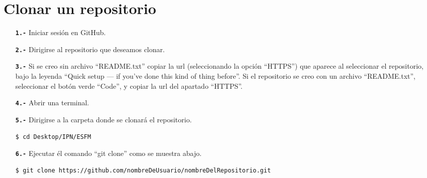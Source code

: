 \section{Clonar un repositorio}
\begin{itemize}
	\item[\textbf{\texttt{1.-}}] Iniciar sesión en GitHub.
	\item[\textbf{\texttt{2.-}}] Dirigirse al repositorio que deseamos clonar.
	\item[\textbf{\texttt{3.-}}] Si se creo sin archivo ``README.txt'' copiar la url (seleccionando la opción ``HTTPS'') que aparece al seleccionar el repositorio, bajo la leyenda ``Quick setup — if you’ve done this kind of thing before''. Si el repositorio se creo con un archivo ``README.txt'', seleccionar el botón verde ``Code'', y copiar la url del apartado ``HTTPS''.
	\item[\textbf{\texttt{4.-}}] Abrir una terminal.
	\item[\textbf{\texttt{5.-}}] Dirigirse a la carpeta donde se clonará el repositorio.
	\begin{lstlisting}[language=bash, caption= Ejemplo. Cambiar de dirección]
$ cd Desktop/IPN/ESFM\end{lstlisting}
	\item[\textbf{\texttt{6.-}}] Ejecutar él comando ``git clone'' como se muestra abajo.
	\begin{lstlisting}[language=bash, caption= Ejemplo. Clonar repositorio]
$ git clone https://github.com/nombreDeUsuario/nombreDelRepositorio.git\end{lstlisting}
\end{itemize}